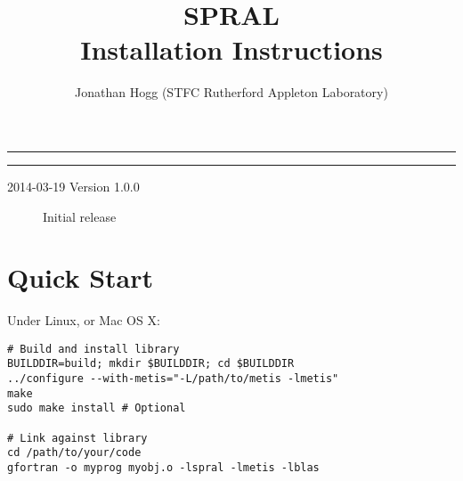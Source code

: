 
\title{SPRAL \\Installation Instructions}
\author{Jonathan Hogg (STFC Rutherford Appleton Laboratory)}
\makeatletter
{}
\hfill
{\Huge \bfseries \textcolor{stfcblue}{\libraryname}}
\vspace{0.1cm}
\textcolor{stfcgrey}{\hrule}
\vspace{0.5cm}

\begin{center}
   \LARGE \bfseries
   \@title
\end{center}
\begin{quote}
   \large
   \thepurpose
\end{quote}

\begin{flushright}
\noindent
\@author
\end{flushright}
\vspace{-0.2cm}
\textcolor{stfcgrey}{\hrule}
\makeatother
\thispagestyle{firststyle}

\versionhistory
\begin{description}
\item[2014-03-19 Version 1.0.0] Initial release
\end{description}


\section{Quick Start}

Under Linux, or Mac OS X:

\begin{verbatim}
# Build and install library
BUILDDIR=build; mkdir $BUILDDIR; cd $BUILDDIR
../configure --with-metis="-L/path/to/metis -lmetis"
make
sudo make install # Optional

# Link against library
cd /path/to/your/code
gfortran -o myprog myobj.o -lspral -lmetis -lblas
\end{verbatim}

